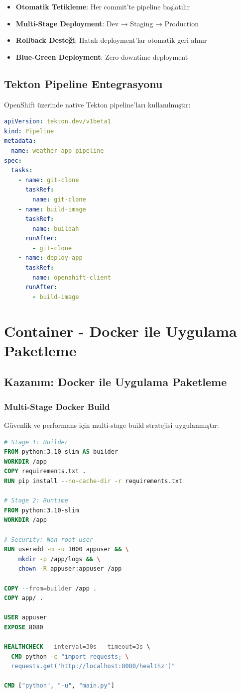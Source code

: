 \documentclass[12pt,a4paper]{article}
\begin{document}
\begin{itemize}
    \item \textbf{Otomatik Tetikleme}: Her commit'te pipeline başlatılır
    \item \textbf{Multi-Stage Deployment}: Dev → Staging → Production
    \item \textbf{Rollback Desteği}: Hatalı deployment'lar otomatik geri alınır
    \item \textbf{Blue-Green Deployment}: Zero-downtime deployment
\end{itemize}

\subsection{Tekton Pipeline Entegrasyonu}

OpenShift üzerinde native Tekton pipeline'ları kullanılmıştır:

\begin{lstlisting}[language=yaml, caption=Tekton Pipeline]
apiVersion: tekton.dev/v1beta1
kind: Pipeline
metadata:
  name: weather-app-pipeline
spec:
  tasks:
    - name: git-clone
      taskRef:
        name: git-clone
    - name: build-image
      taskRef:
        name: buildah
      runAfter:
        - git-clone
    - name: deploy-app
      taskRef:
        name: openshift-client
      runAfter:
        - build-image
\end{lstlisting}

\section{Container - Docker ile Uygulama Paketleme}

\subsection{Kazanım: Docker ile Uygulama Paketleme}

\subsubsection{Multi-Stage Docker Build}

Güvenlik ve performans için multi-stage build stratejisi uygulanmıştır:

\begin{lstlisting}[language=dockerfile, caption=Multi-Stage Dockerfile]
# Stage 1: Builder
FROM python:3.10-slim AS builder
WORKDIR /app
COPY requirements.txt .
RUN pip install --no-cache-dir -r requirements.txt

# Stage 2: Runtime
FROM python:3.10-slim
WORKDIR /app

# Security: Non-root user
RUN useradd -m -u 1000 appuser && \
    mkdir -p /app/logs && \
    chown -R appuser:appuser /app

COPY --from=builder /app .
COPY app/ .

USER appuser
EXPOSE 8080

HEALTHCHECK --interval=30s --timeout=3s \
  CMD python -c "import requests; \
  requests.get('http://localhost:8080/healthz')"

CMD ["python", "-u", "main.py"]
\end{lstlisting}
\end{document}

